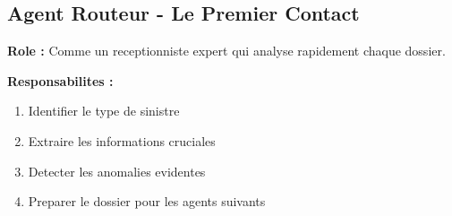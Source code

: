 \documentclass[a4paper,12pt]{article}
\begin{document}
\subsection{Agent Routeur - Le Premier Contact}

\textbf{Role :} Comme un receptionniste expert qui analyse rapidement chaque dossier.

\textbf{Responsabilites :}
\begin{enumerate}
    \item Identifier le type de sinistre
    \item Extraire les informations cruciales
    \item Detecter les anomalies evidentes
    \item Preparer le dossier pour les agents suivants
\end{enumerate}
\end{document}
